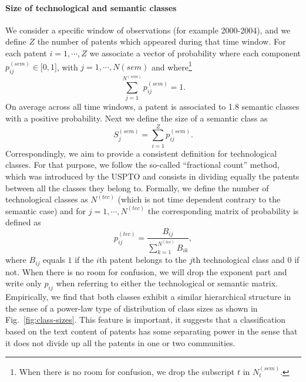 \documentclass[12pt,twoside,a4paper]{article}
\begin{document}
\paragraph*{Size of technological and semantic classes} 
We consider a specific window of observations (for example 2000-2004), and we define $Z$ the number of patents which appeared during that time window. For each patent $i=1, \cdots, Z$ we associate a vector of probability where each component $p_{ij}^{(sem)} \in \big[ 0,1 \big]$, with  $j = 1, \cdots, N{(sem)}$ and where\footnote{When there is no room for confusion, we drop the subscript $t$ in $N_t^{(sem)}$.} 
$$\displaystyle \sum_{j=1}^{N^{(sem)}} p_{ij}^{(sem)} = 1.$$ On average across all time windows, a patent is associated to 1.8 semantic classes with a positive probability. Next we define the size of a semantic class as $$S_j^{(sem)} = \displaystyle \sum_{i=1}^Z p_{ij}^{(sem)}.$$ 
Correspondingly, we aim to provide a consistent definition for technological classes. For that purpose, we follow the so-called ``fractional count'' method, which was introduced by the USPTO and consists in dividing equally the patents between all the classes they belong to. Formally, we define the number of technological classes as
$N^{(tec)}$  (which is not time dependent contrary to the semantic case) and for $j = 1, \cdots, N^{(tec)}$ the corresponding matrix of probability is defined as
\[
 p_{ij}^{(tec)} = \frac{B_{ij}}{\displaystyle \sum_{k=1}^{N^{(tec)}}{B_{ik}}},
\]
where  $B_{ij}$ equals $1$ if the $i$th patent belongs to the $j$th technological class and $0$ if not. When there is no room for confusion, we will drop the exponent part and write only $p_{ij}$ when referring to either the technological or semantic matrix. Empirically, we find that both classes exhibit a similar hierarchical structure in the sense of a power-law type of distribution of class sizes as shown in Fig.~\ref{fig:class-sizes}. This feature is important, it suggests that a classification based on the text content of patents has some separating power in the sense that it does not divide up all the patents in one or two communities. 
\end{document}

